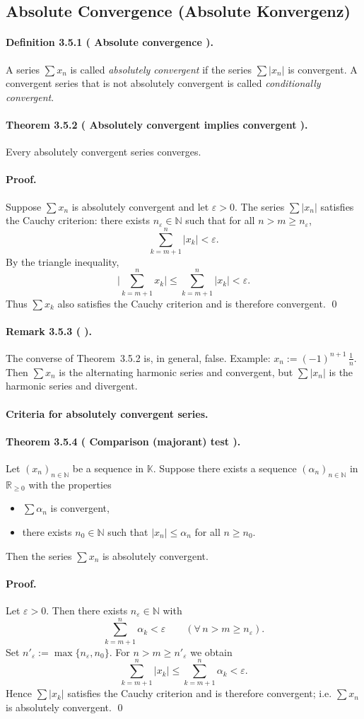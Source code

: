 \documentclass[12pt,a4paper]{article}
\newcommand{\N}{\mathbb{N}}
\newcommand{\R}{\mathbb{R}}
\newcommand{\K}{\mathbb{K}} %
\newcommand{\eps}{\varepsilon}
\newcommand{\NumberedDefinition}[3]{%
\paragraph*{Definition #1 ( #2 ).} #3\par}
\newcommand{\NumberedTheorem}[3]{%
\paragraph*{Theorem #1 ( #2 ).} #3\par}
\newcommand{\NumberedRemark}[3]{%
\paragraph*{Remark #1 ( #2 ).} #3\par}
\theoremstyle{plain}
\theoremstyle{definition}
\theoremstyle{remark}
\begin{document}
\subsection{Absolute Convergence (Absolute Konvergenz)}

\NumberedDefinition{3.5.1}{Absolute convergence}{A series $\sum x_n$ is called \emph{absolutely convergent} if the series $\sum |x_n|$ is convergent. A convergent series that is not absolutely convergent is called \emph{conditionally convergent}.}

\NumberedTheorem{3.5.2}{Absolutely convergent implies convergent}{Every absolutely convergent series converges.}
\paragraph{Proof.}
Suppose $\sum x_n$ is absolutely convergent and let $\eps>0$. The series $\sum |x_n|$ satisfies the Cauchy criterion: there exists $n_\eps\in\N$ such that for all $n>m\ge n_\eps$,
\[
	\sum_{k=m+1}^{n} |x_k| < \eps.
\]
By the triangle inequality,
\[
	\Bigg|\sum_{k=m+1}^{n} x_k\Bigg| \le \sum_{k=m+1}^{n} |x_k| < \eps.
\]
Thus $\sum x_k$ also satisfies the Cauchy criterion and is therefore convergent. \qed

\NumberedRemark{3.5.3}{}{The converse of Theorem~3.5.2 is, in general, false. Example: $x_n := (-1)^{n+1}\,\tfrac{1}{n}$. Then $\sum x_n$ is the alternating harmonic series and convergent, but $\sum |x_n|$ is the harmonic series and divergent.}

\paragraph{Criteria for absolutely convergent series.}

\NumberedTheorem{3.5.4}{Comparison (majorant) test}{Let $(x_n)_{n\in\N}$ be a sequence in $\K$. Suppose there exists a sequence $(\alpha_n)_{n\in\N}$ in $\R_{\ge0}$ with the properties
\begin{itemize}
	\item $\sum \alpha_n$ is convergent,
	\item there exists $n_0\in\N$ such that $|x_n|\le \alpha_n$ for all $n\ge n_0$.
\end{itemize}
Then the series $\sum x_n$ is absolutely convergent.}
\paragraph{Proof.}
Let $\eps>0$. Then there exists $n_\eps\in\N$ with
\[
	\sum_{k=m+1}^{n} \alpha_k < \eps \qquad (\forall\, n>m\ge n_\eps).
\]
Set $n'_\eps := \max\{n_\eps, n_0\}$. For $n>m\ge n'_\eps$ we obtain
\[
	\sum_{k=m+1}^{n} |x_k| \le \sum_{k=m+1}^{n} \alpha_k < \eps.
\]
Hence $\sum |x_k|$ satisfies the Cauchy criterion and is therefore convergent; i.e. $\sum x_n$ is absolutely convergent. \qed
\end{document}
